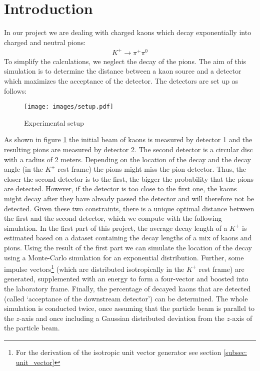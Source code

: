 \documentclass[12pt,a4paper,oneside,english]{article}
\begin{document}
\section{Introduction}
In our project we are dealing with charged kaons which decay exponentially into charged and neutral pions:
\begin{align*}
K^+ \longrightarrow \pi^+ \pi^0
\end{align*}
To simplify the calculations, we neglect the decay of the pions. The aim of this simulation is to determine the distance between a kaon source and a detector which maximizes the acceptance of the detector. The detectors are set up as follows:
\begin{figure}[H]
	\centering
	\texttt{[image: images/setup.pdf]}
	\caption{Experimental setup}
	\label{fig:setup}
\end{figure}
As shown in figure \ref{fig:setup} the initial beam of kaons is measured by detector 1 and the resulting pions are measured by detector 2. The second detector is a circular disc with a radius of 2 meters. Depending on 
the location of the decay and
the decay angle (in the $K^+$ rest frame)
the pions might miss the pion detector. Thus, the closer the second detector is to the first, the bigger the probability that the pions are detected. However, if the detector is too close to the first one, the kaons might decay after they have already passed the detector and will therefore not be detected. Given these two constraints, there is a unique optimal distance between the first and the second detector, which we compute with the following simulation. 
In the first part of this project, the average decay length of a $K^+$ is estimated based on a dataset containing the decay lengths of a mix of kaons and pions. Using the result of the first part we can simulate the location of the decay using a Monte-Carlo simulation for an exponential distribution. Further, some impulse vectors\footnote{For the derivation of the isotropic unit vector generator see section \ref{subsec: unit_vector}} (which are distributed isotropically in the $K^+$ rest frame) are generated, supplemented with an energy to form a four-vector and boosted into the laboratory frame. Finally, the percentage of decayed kaons that are detected (called ‘acceptance of the downstream detector’) can be determined. 
The whole simulation is conducted twice, once assuming that the particle beam is parallel to the $z$-axis and once including a Gaussian distributed deviation from the $z$-axis of the particle beam. 
\end{document}
